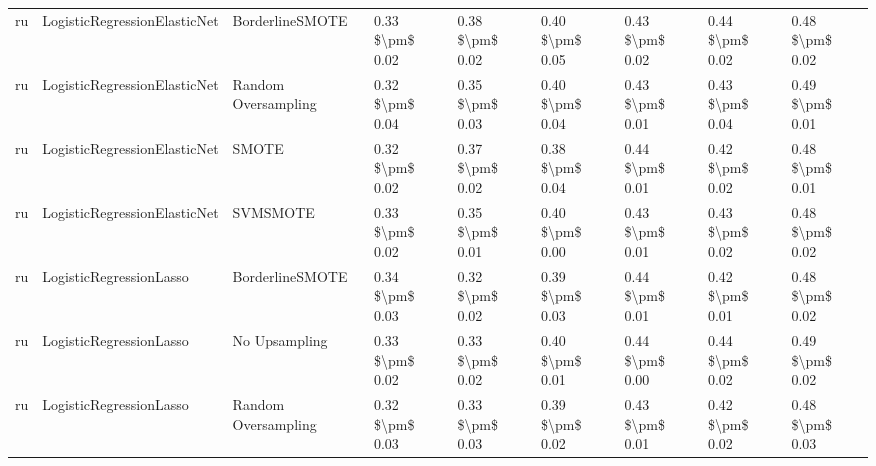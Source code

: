 \begin{tabular}{lllllllll}
      ru &    LogisticRegressionElasticNet &               BorderlineSMOTE & 0.33 \$\textbackslash pm\$ 0.02 &           0.38 \$\textbackslash pm\$ 0.02 &       0.40 \$\textbackslash pm\$ 0.05 &        0.43 \$\textbackslash pm\$ 0.02 &                         0.44 \$\textbackslash pm\$ 0.02 &     0.48 \$\textbackslash pm\$ 0.02 \\
      ru &    LogisticRegressionElasticNet &           Random Oversampling & 0.32 \$\textbackslash pm\$ 0.04 &           0.35 \$\textbackslash pm\$ 0.03 &       0.40 \$\textbackslash pm\$ 0.04 &        0.43 \$\textbackslash pm\$ 0.01 &                         0.43 \$\textbackslash pm\$ 0.04 &     0.49 \$\textbackslash pm\$ 0.01 \\
      ru &    LogisticRegressionElasticNet &                         SMOTE & 0.32 \$\textbackslash pm\$ 0.02 &           0.37 \$\textbackslash pm\$ 0.02 &       0.38 \$\textbackslash pm\$ 0.04 &        0.44 \$\textbackslash pm\$ 0.01 &                         0.42 \$\textbackslash pm\$ 0.02 &     0.48 \$\textbackslash pm\$ 0.01 \\
      ru &    LogisticRegressionElasticNet &                      SVMSMOTE & 0.33 \$\textbackslash pm\$ 0.02 &           0.35 \$\textbackslash pm\$ 0.01 &       0.40 \$\textbackslash pm\$ 0.00 &        0.43 \$\textbackslash pm\$ 0.01 &                         0.43 \$\textbackslash pm\$ 0.02 &     0.48 \$\textbackslash pm\$ 0.02 \\
      ru &         LogisticRegressionLasso &               BorderlineSMOTE & 0.34 \$\textbackslash pm\$ 0.03 &           0.32 \$\textbackslash pm\$ 0.02 &       0.39 \$\textbackslash pm\$ 0.03 &        0.44 \$\textbackslash pm\$ 0.01 &                         0.42 \$\textbackslash pm\$ 0.01 &     0.48 \$\textbackslash pm\$ 0.02 \\
      ru &         LogisticRegressionLasso &                 No Upsampling & 0.33 \$\textbackslash pm\$ 0.02 &           0.33 \$\textbackslash pm\$ 0.02 &       0.40 \$\textbackslash pm\$ 0.01 &        0.44 \$\textbackslash pm\$ 0.00 &                         0.44 \$\textbackslash pm\$ 0.02 &     0.49 \$\textbackslash pm\$ 0.02 \\
      ru &         LogisticRegressionLasso &           Random Oversampling & 0.32 \$\textbackslash pm\$ 0.03 &           0.33 \$\textbackslash pm\$ 0.03 &       0.39 \$\textbackslash pm\$ 0.02 &        0.43 \$\textbackslash pm\$ 0.01 &                         0.42 \$\textbackslash pm\$ 0.02 &     0.48 \$\textbackslash pm\$ 0.03 \\

\end{tabular}

